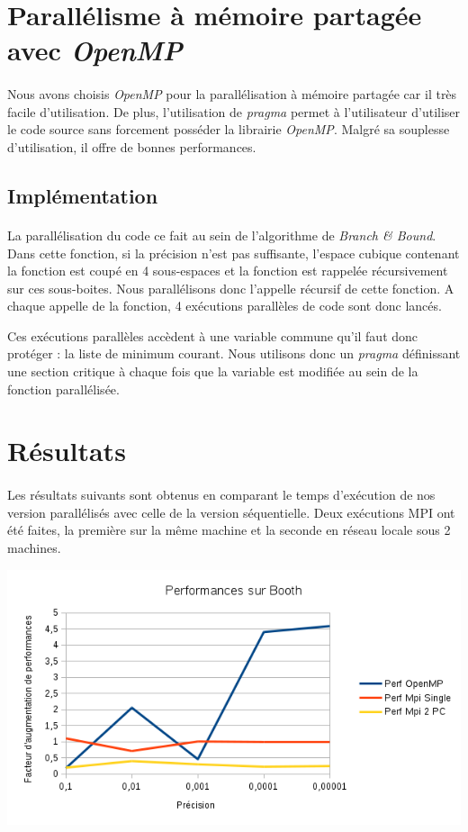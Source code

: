 \documentclass[a4paper]{article}
\begin{document}
\section{Parallélisme à mémoire partagée avec \emph{OpenMP}}
	\paragraph{}
	Nous avons choisis \emph{OpenMP} pour la parallélisation à mémoire partagée car il très facile d'utilisation. De plus, l'utilisation de \emph{pragma} permet à l'utilisateur d'utiliser le code source sans forcement posséder la librairie \emph{OpenMP}. Malgré sa souplesse d'utilisation, il offre de bonnes performances.
    \subsection{Implémentation}
    \paragraph{}
    La parallélisation du code ce fait au sein de l'algorithme de \emph{Branch \& Bound}. Dans cette fonction, si la précision n'est pas suffisante, l'espace cubique contenant la fonction est coupé en 4 sous-espaces et la fonction est rappelée récursivement sur ces sous-boites. Nous parallélisons donc l'appelle récursif de cette fonction. A chaque appelle de la fonction, 4 exécutions parallèles de code sont donc lancés.
    
    Ces exécutions parallèles accèdent à une variable commune qu'il faut donc protéger : la liste de minimum courant. Nous utilisons donc un \emph{pragma} définissant une section critique à chaque fois que la variable est modifiée au sein de la fonction parallélisée.
    
\section{Résultats}
	\paragraph{}
	Les résultats suivants sont obtenus en comparant le temps d’exécution de nos version parallélisés avec celle de la version séquentielle. Deux exécutions MPI ont été faites, la première sur la même machine et la seconde en réseau locale sous 2 machines.
\begin{center}
\includegraphics[scale=0.7]{graph_booth.png}
\end{center}
\end{document}
